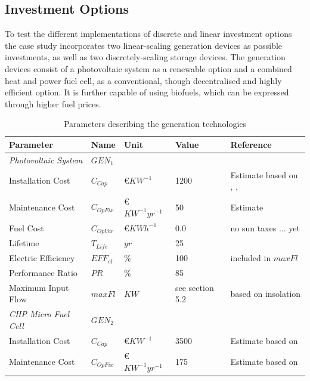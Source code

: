 \documentclass[
	11pt,								%
	DIV10,								%
	a4paper,         					%
	oneside,							%
	headheight=20pt,					%
	footheight=20pt,					%
    parskip=full,						%
    listof=totoc,						%
	bibliography=totoc,					%
	index=totoc,						%
]{scrartcl}
\begin{document}
\subsection{Investment Options}
To test the different implementations of discrete and linear investment options the case study incorporates two linear-scaling generation devices as possible investments, as well as two discretely-scaling storage devices. The generation devices consist of a photovoltaic system as a renewable option and a combined heat and power fuel cell, as a conventional, though decentralised and highly efficient option. It is further capable of using biofuels, which can be expressed through higher fuel prices. 
\begin{table}[H]
	\centering
	\caption{Parameters describing the generation technologies}
	\begin{tabular}{lllll}
		\hline
		\textbf{Parameter}			& \textbf{Name}			& \textbf{Unit}			& \textbf{Value}	&\textbf{Reference}     \\ \hline
		\textit{Photovoltaic System} & $GEN_1$ & & &\\
		Installation Cost           & $C_{Cap}$     		& \euro $KW^{-1}$  		& 1200				& Estimate based on \cite{wirthAktuelleFaktenZur2018}, \cite{SolarmoduleEBay2018}, \cite{ModulePriceIndex2018}   \\
		Maintenance Cost            & $C_{OpFix}$     		& \euro $KW^{-1}yr^{-1}$& 50				& Estimate \\
		Fuel	 Cost           			& $C_{OpVar}$     		& \euro $KWh^{-1}$   	& 0.0			& no sun taxes ... yet  \\
		Lifetime                    & $T_{Life}$     		& $yr$  				& 25 				& \cite{wirthAktuelleFaktenZur2018}   \\
		Electric Efficiency         & $EFF_{el}$     		& $\%$  				& 100				& included in $maxFl$      \\
		Performance Ratio           & $PR$     		& $\%$  				& 85				& \cite{wirthAktuelleFaktenZur2018}   \\
		Maximum Input Flow  			& $maxFl$     		& $KW$ 		 			& see section 5.2				& based on insolation   \\
		\hline
		\textit{CHP Micro Fuel Cell} & $GEN_2$ & & &\\
		Installation Cost           & $C_{Cap}$     		& \euro $KW^{-1}$  		& 3500 				& Estimate based on \cite{LAUINGER201624}    \\
		Maintenance Cost            & $C_{OpFix}$     		& \euro $KW^{-1}yr^{-1}$& 175				& Estimate based on \cite{LAUINGER201624}   \\

\end{tabular}
\end{table}
\end{document}
